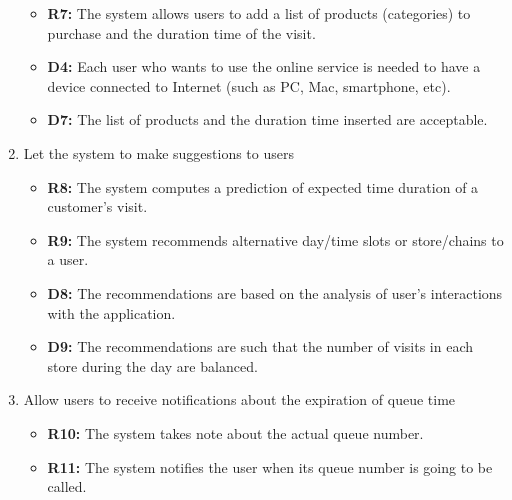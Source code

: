 \documentclass[table, 12pt]{article}
\begin{document}
\begin{enumerate}[label=\textbf{-G\arabic*}:]
{\begin{itemize}
              \item \textbf{R7:} The system allows users to add a list of products (categories) to purchase and the duration time of the visit.
              \item \textbf{D4:} Each user who wants to use the online service is needed to have a device connected to Internet (such as PC, Mac, smartphone, etc).
              \item \textbf{D7:} The list of products and the duration time inserted are acceptable.
          \end{itemize}
          }
    \item {Let the system to make suggestions to users
          \begin{itemize}
              \item \textbf{R8:} The system computes a prediction of expected time duration of a customer's visit.
              \item \textbf{R9:} The system recommends alternative day/time slots or store/chains to a user.
              \item \textbf{D8:} The recommendations are based on the analysis of user's interactions with the application.
              \item \textbf{D9:} The recommendations are such that the number of visits in each store during the day are balanced.
          \end{itemize}
          }
    \item {Allow users to receive notifications about the expiration of queue time
          \begin{itemize}
              \item \textbf{R10:} The system takes note about the actual queue number.
              \item \textbf{R11:} The system notifies the user when its queue number is going to be called.
          \end{itemize}
          }
\end{enumerate}
\end{document}

